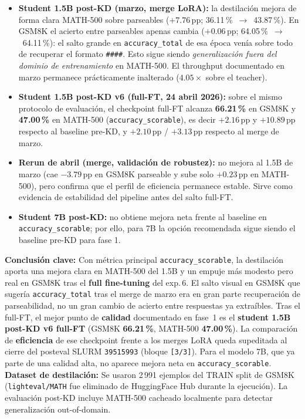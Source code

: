 \documentclass[11pt,a4paper]{article}
\begin{document}
\begin{itemize}
  \item \textbf{Student 1.5B post-KD (marzo, merge LoRA):} la
    destilaci\'on mejora de forma clara MATH-500 sobre parseables
    ($+7.76$\,pp; 36.11\,\%~$\to$~43.87\,\%). En GSM8K el acierto entre
    parseables apenas cambia ($+0.06$\,pp; 64.05\,\%~$\to$~64.11\,\%): el
    salto grande en \texttt{accuracy\_total} de esa \'epoca ven\'ia sobre
    todo de recuperar el formato \texttt{\#\#\#\#}. Esto sigue siendo
    \emph{generalizaci\'on fuera del dominio de entrenamiento} en MATH-500.
    El throughput documentado en marzo permanece pr\'acticamente inalterado
    ($4.05\times$ sobre el teacher).

  \item \textbf{Student 1.5B post-KD v6 (full-FT, 24 abril 2026):} sobre el
    mismo protocolo de evaluaci\'on, el checkpoint full-FT alcanza
    \textbf{66.21\,\%} en GSM8K y \textbf{47.00\,\%} en MATH-500
    (\texttt{accuracy\_scorable}), es decir
    $\mathbf{+2.16}$\,pp y $\mathbf{+10.89}$\,pp respecto al baseline
    pre-KD, y $+2.10$\,pp / $+3.13$\,pp respecto al merge de marzo.

  \item \textbf{Rerun de abril (merge, validaci\'on de robustez):} no mejora al
    1.5B de marzo (cae $-3.79$\,pp en GSM8K parseable y sube solo
    $+0.23$\,pp en MATH-500),
    pero confirma que el perfil de eficiencia permanece estable. Sirve
    como evidencia de estabilidad del pipeline antes del salto full-FT.

  \item \textbf{Student 7B post-KD:} no obtiene mejora neta frente al
    baseline en \texttt{accuracy\_scorable}; por ello, para 7B la opci\'on
    recomendada sigue siendo el baseline pre-KD para fase 1.
\end{itemize}

\begin{infobox}
\textbf{Conclusi\'on clave:} Con m\'etrica principal
\texttt{accuracy\_scorable}, la destilaci\'on aporta una mejora clara en
MATH-500 del 1.5B y un empuje m\'as modesto pero real en GSM8K tras el
\textbf{full fine-tuning} del exp.\,6. El salto visual en GSM8K que
suger\'ia \texttt{accuracy\_total} tras el merge de marzo era en gran
parte recuperaci\'on de parseabilidad, no un gran cambio de acierto entre
respuestas ya extra\'ibles. Tras el full-FT, el mejor punto de
\textbf{calidad} documentado en fase~1 es el
\textbf{student 1.5B post-KD v6 full-FT} (GSM8K \textbf{66.21\,\%},
MATH-500 \textbf{47.00\,\%}). La comparaci\'on de \textbf{eficiencia}
de ese checkpoint frente a los merges LoRA queda supeditada al cierre
del posteval SLURM \texttt{39515993} (bloque \texttt{[3/3]}). Para el
modelo 7B, que ya parte de una calidad alta, no aparece mejora neta en
\texttt{accuracy\_scorable}.
\\[4pt]
\textbf{Dataset de destilaci\'on:} Se usaron 2\,991 ejemplos del
TRAIN split de GSM8K (\texttt{lighteval/MATH} fue eliminado de
HuggingFace Hub durante la ejecuci\'on). La evaluaci\'on post-KD incluye
MATH-500 cacheado localmente para detectar generalizaci\'on
out-of-domain.
\end{infobox}
\end{document}
